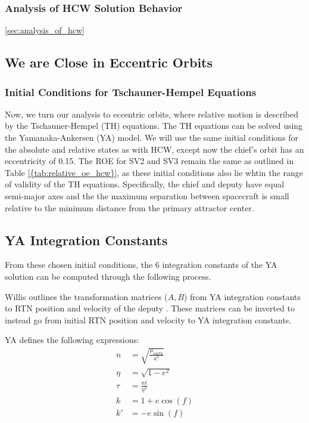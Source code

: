 \subsubsection{Analysis of HCW Solution Behavior}\ref{sec:analysis_of_hcw}


\newpage

\subsection{We are Close in Eccentric Orbits}
\subsubsection{Initial Conditions for Tschauner-Hempel Equations}
Now, we turn our analysis to eccentric orbits, where relative motion is described by the Tschauner-Hempel (TH) equations. The TH equations can be solved using the Yamanaka-Ankersen (YA) model. We will use the same initial conditions for the absolute and relative states as with HCW, except now the chief's orbit has an eccentricity of 0.15. The ROE for SV2 and SV3 remain the same as outlined in Table \ref{{tab:relative_oe_hcw}}, as these initial conditions also lie whtin the range of validity of the TH equations. Specifically, the chief and deputy have equal semi-major axes and the the maximum separation between spacecraft is small relative to the minimum distance from the primary attractor center. 

\subsection{YA Integration Constants}
From these chosen initial conditions, the 6 integration constants of the YA solution can be computed through the following process.

Willis outlines the transformation matrices ($A,B$) from YA integration constants to RTN position and velocity of the deputy \cite{willis2023analytical}. These matrices can be inverted to instead go from initial RTN position and velocity to YA integration constants. 

YA defines the following expressions:
\begin{align*}
n &= \sqrt{\frac{\mu_{\text{earth}}}{a^3}} \\
\eta &= \sqrt{1 - e^2} \\
\tau &= \frac{nt}{\eta^3}\\
k &= 1 + e \cos(f) \\
k' &= -e \sin(f)
\end{align*}

